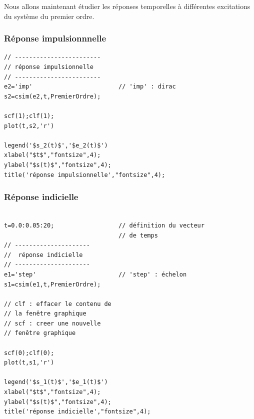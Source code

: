 Nous allons maintenant étudier les réponses temporelles 
à différentes excitations du système du premier ordre.
\subsubsection{Réponse impulsionnnelle}
\begin{code}
\begin{verbatim}
// ------------------------
// réponse impulsionnelle
// ------------------------
e2='imp'                        // 'imp' : dirac
s2=csim(e2,t,PremierOrdre);   

scf(1);clf(1);
plot(t,s2,'r')

legend('$s_2(t)$','$e_2(t)$')
xlabel("$t$","fontsize",4);
ylabel("$s(t)$","fontsize",4); 
title('réponse impulsionnelle',"fontsize",4);
\end{verbatim}
\end{code}

\subsubsection{Réponse indicielle}
\begin{code}
\begin{verbatim}

t=0.0:0.05:20;                  // définition du vecteur 
                                // de temps
// ---------------------
//  réponse indicielle
// ---------------------
e1='step'                       // 'step' : échelon
s1=csim(e1,t,PremierOrdre);    

// clf : effacer le contenu de
// la fenêtre graphique
// scf : creer une nouvelle 
// fenêtre graphique

scf(0);clf(0);
plot(t,s1,'r')

legend('$s_1(t)$','$e_1(t)$')
xlabel("$t$","fontsize",4);
ylabel("$s(t)$","fontsize",4); 
title('réponse indicielle',"fontsize",4);
\end{verbatim}
\end{code}


